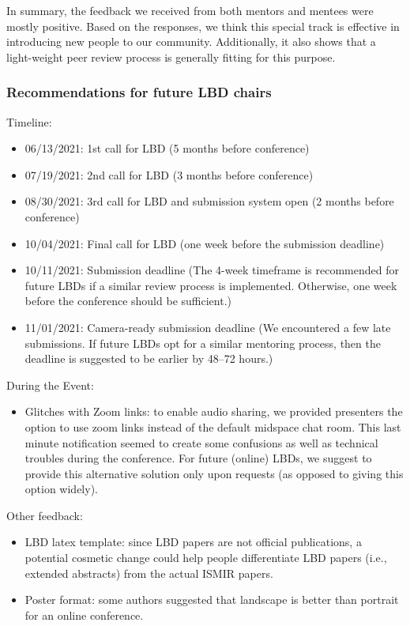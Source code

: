 \documentclass[%
10pt,								%
]
{scrartcl}
\begin{document}
            In summary, the feedback we received from both mentors and mentees were mostly positive. Based on the responses, we think this special track is effective in introducing new people to our community. Additionally, it also shows that a light-weight peer review process is generally fitting for this purpose. 
        
        \subsubsection{Recommendations for future LBD chairs}
            Timeline:
            \begin{itemize}
                \item   06/13/2021: 1st call for LBD (5 months before conference)
                \item   07/19/2021: 2nd call for LBD (3 months before conference)
                \item   08/30/2021: 3rd call for LBD and submission system open (2 months before conference)
                \item   10/04/2021: Final call for LBD (one week before the submission deadline)
                \item   10/11/2021: Submission deadline (The 4-week timeframe is recommended for future LBDs if a similar review process is implemented. Otherwise, one week before the conference should be sufficient.)
                \item   11/01/2021: Camera-ready submission deadline (We encountered a few late submissions. If future LBDs opt for a similar mentoring process, then the deadline is suggested to be earlier by 48--72 hours.)
            \end{itemize}
            
            During the Event:
            \begin{itemize}
                \item Glitches with Zoom links: to enable audio sharing, we provided presenters the option to use zoom links instead of the default midspace chat room. This last minute notification seemed to create some confusions as well as technical troubles during the conference. For future (online) LBDs, we suggest to provide this alternative solution only upon requests (as opposed to giving this option widely). 
            \end{itemize}
            
            Other feedback:
            \begin{itemize}
                \item   LBD latex template: since LBD papers are not official publications, a potential cosmetic change could help people differentiate LBD papers (i.e., extended abstracts) from the actual ISMIR papers. 
                \item   Poster format: some authors suggested that landscape is better than portrait for an online conference.
            \end{itemize}
    
\end{document}
